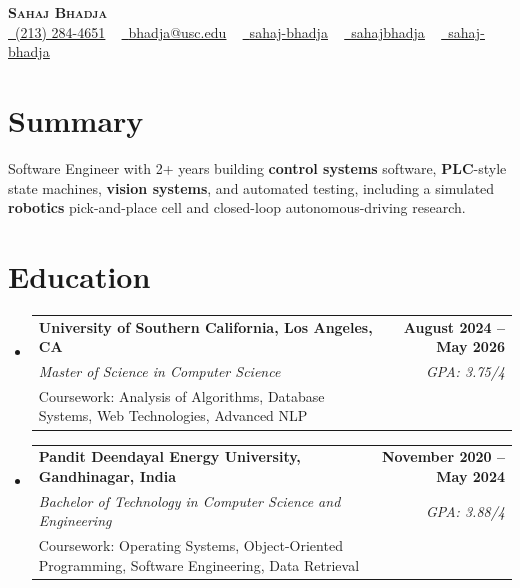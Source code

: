\documentclass[letterpaper,10pt]{article}
\makeatletter
\newcommand{\sectionGap}{\vspace{-8pt}}
\newcommand{\resumeEduSubheading}[5]{\vspace{-1pt}\item\begin{tabular*}{1.0\textwidth}[t]{l@{\extracolsep{\fill}}r}\textbf{#1} & \textbf{\small #2} \\\textit{\small #3} & \textit{\small #4} \\\small #5 & \\\end{tabular*}\vspace{-4pt}}
\newcommand{\resumeSubHeadingListStart}{\begin{itemize}[leftmargin=0.0in, label={}]}
\newcommand{\resumeSubHeadingListEnd}{\end{itemize}}
\makeatother
\begin{document}
\begin{center}
{\Huge \scshape \textbf{Sahaj Bhadja}} \\ \vspace{1pt}
\small \href{tel:2132844651}{\faPhone\ \underline{(213) 284-4651}} ~ \href{mailto:bhadja@usc.edu}{\raisebox{-0.2\height}\faEnvelope\ \underline{bhadja@usc.edu}} ~
\href{https://www.linkedin.com/in/sahaj-bhadja/}{\raisebox{-0.2\height}\faLinkedin\ \underline{sahaj-bhadja}} ~ \href{https://github.com/SAHAJ-BHADJA}{\raisebox{-0.2\height}\faGithub\ \underline{sahajbhadja}} ~
\href{https://sahaj-bhadja.vercel.app/}{\raisebox{-0.2\height}\faGlobe\ \underline{sahaj-bhadja}}
\end{center}
\vspace{-16pt}
\section{Summary}
\begin{itemize}[leftmargin=0.15in, label={}]
\small{\item{Software Engineer with 2+ years building \textbf{control systems} software, \textbf{PLC}-style state machines, \textbf{vision systems}, and automated testing, including a simulated \textbf{robotics} pick-and-place cell and closed-loop autonomous-driving research.}}
\end{itemize}
\sectionGap
\section{Education}
\resumeSubHeadingListStart
\resumeEduSubheading{University of Southern California, Los Angeles, CA}{August 2024 -- May 2026}{Master of Science in Computer Science}{GPA: 3.75/4}{Coursework: Analysis of Algorithms, Database Systems, Web Technologies, Advanced NLP}
\resumeEduSubheading{Pandit Deendayal Energy University, Gandhinagar, India}{November 2020 -- May 2024}{Bachelor of Technology in Computer Science and Engineering}{GPA: 3.88/4}{Coursework: Operating Systems, Object-Oriented Programming, Software Engineering, Data Retrieval}
\resumeSubHeadingListEnd
\sectionGap
\end{document}
